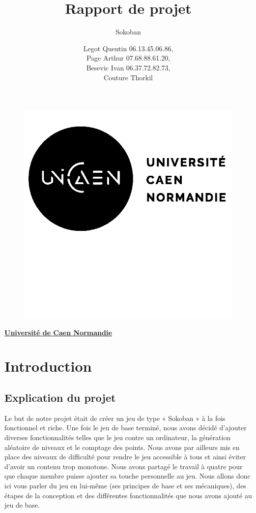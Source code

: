 \documentclass[a4paper,12pt]{article}
\title{Rapport de projet}
\subtitle{Sokoban}
\author{Legot Quentin 06.13.45.06.86,\\
Page Arthur 07.68.88.61.20,\\
Besevic Ivan 06.37.72.82.73,\\
Couture Thorkil}
\begin{document}
\begin{figure}
 \centering
 \includegraphics[width=0.7\linewidth]{Illustrations/unicaen.png}
\end{figure}

\maketitle

\begin{center}
\href{http://www.unicaen.fr}{\textbf{Université de Caen Normandie}}
\end{center}


\newpage

\tableofcontents

\newpage


\section{Introduction}
\subsection{Explication du projet}

Le but de notre projet était de créer un jeu de type « Sokoban » à la fois fonctionnel et riche. Une fois le jeu de base terminé, nous avons décidé d’ajouter diverses fonctionnalités telles que le jeu contre un ordinateur, la génération aléatoire de niveaux et le comptage des points. Nous avons par ailleurs mis en place des niveaux de difficulté pour rendre le jeu accessible à tous et ainsi éviter d’avoir un contenu trop monotone. Nous avons partagé le travail à quatre pour que chaque membre puisse ajouter sa touche personnelle au jeu. Nous allons donc ici vous parler du jeu en lui-même (ses principes de base et ses mécaniques), des étapes de la conception et des différentes fonctionnalités que nous avons ajouté au jeu de base.
\end{document}
